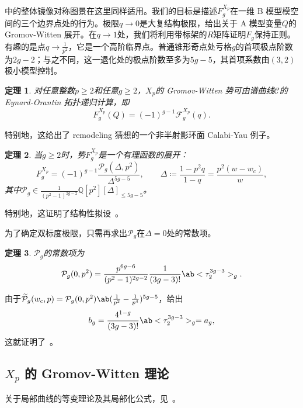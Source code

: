 \documentclass{amsart}
\newtheorem{thm}{定理}[section]
\theoremstyle{definition}
\theoremstyle{remark}
\theoremstyle{plain}
\theoremstyle{definition}
\theoremstyle{remark}
\newcommand{\Q}{\mathbb{Q}}
\newcommand{\mc}[1]{\mathcal{#1}}
\newcommand{\wt}[1]{\widetilde{#1}}
\newcommand{\1}{\mathbf{1}}
\newcommand{\2}{\mathbf{2}}
\newcommand{\3}{\mathbf{3}}
\begin{document}
中的整体镜像对称图景在这里同样适用。我们的目标是描述\(F_g^{X_p}\)在一维 B 模型模空间的三个边界点处的行为。极限\(q \to 0\)是大复结构极限，给出关于 A 模型变量\(Q\)的 Gromov-Witten 展开。在\(q \to 1\)处，我们将利用带标架的\(R\)矩阵证明\(F_g\)保持正则。有趣的是点\(q \to \frac{1}{p^2}\)，它是一个高阶临界点。普通锥形奇点处亏格\(g\)的首项极点阶数为\(2g-2\)；与之不同，这一退化处的极点阶数至多为\(5g-5\)，其首项系数由\((3,2)\)极小模型控制。

\begin{thm}%
\label{thm:local P1 mirror symmetry}
    对任意整数\(p \geq 2\)和任意\(g \geq 2\)，\(X_p\)的 Gromov-Witten 势可由谱曲线\(\mc{C}\)的 Eynard-Orantin 拓扑递归计算，即
    \[ F_g^{X_p}(Q) = (-1)^{g-1}\mc{F}_g^{X_p}(q). \]
\end{thm}

特别地，这给出了 remodeling 猜想的一个非半射影环面 Calabi-Yau 例子。

\begin{thm}%
\label{thm:local P1 rationality}
    当\(g \geq 2\)时，势\(F_g^{X_p}\)是一个有理函数的展开：
    \[ F_g^{X_p} = (-1)^{g-1}\frac{\mc{P}_g(\Delta,p^2)}{\Delta^{5g-5}}, \qquad \Delta \coloneqq \frac{1-p^2q}{1-q} = \frac{p^2(w-w_c)}{w}, \]
    其中\(\mc{P}_g \in \frac{1}{(p^2-1)^{2g-2}}\Q[p^2][\Delta]_{\leq 5g-5}\)。
\end{thm}

特别地，这证明了结构性拟设~。

为了确定双标度极限，只需再求出\(\mc{P}_g\)在\(\Delta = 0\)处的常数项。

\begin{thm}%
\label{thm:local P1 constant term}
    \(\mc{P}_g\)的常数项为
    \[ \mc{P}_g(0,p^2) = \frac{p^{6g-6}}{(p^2-1)^{2g-2}}\frac{1}{(3g-3)!}\ab<\tau_2^{3g-3}>_g. \]
\end{thm}

由于\(\wt{\mc{P}}_g(w_c,p) = \mc{P}_g(0,p^2)\ab(\frac{1}{p^2}-\frac{1}{p^4})^{5g-5}\)，给出
\[ b_g = \frac{4^{1-g}}{(3g-3)!}\ab<\tau_2^{3g-3}>_g = a_g, \]
这就证明了~。

\subsection{\(X_p\) 的 Gromov-Witten 理论}%
\label{sub:Gromov-Witten theory of Xp}

关于局部曲线的等变理论及其局部化公式，见~\cite{BryanPandharipande2008}。
\end{document}
